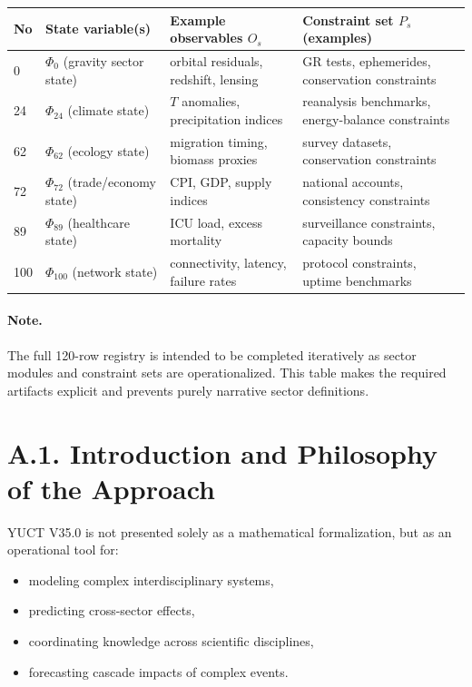 \documentclass[13pt,a4paper]{article}
\begin{document}
	\begin{longtable}{|p{0.8cm}|p{4.2cm}|p{4.5cm}|p{4.7cm}|}
		\hline
		\textbf{No} & \textbf{State variable(s)} & \textbf{Example observables $O_s$} & \textbf{Constraint set $P_s$ (examples)} \\
		\hline
		\endhead
		0 & $\Phi_0$ (gravity sector state) & orbital residuals, redshift, lensing & GR tests, ephemerides, conservation constraints \\
		\hline
		24 & $\Phi_{24}$ (climate state) & $T$ anomalies, precipitation indices & reanalysis benchmarks, energy-balance constraints \\
		\hline
		62 & $\Phi_{62}$ (ecology state) & migration timing, biomass proxies & survey datasets, conservation constraints \\
		\hline
		72 & $\Phi_{72}$ (trade/economy state) & CPI, GDP, supply indices & national accounts, consistency constraints \\
		\hline
		89 & $\Phi_{89}$ (healthcare state) & ICU load, excess mortality & surveillance constraints, capacity bounds \\
		\hline
		100 & $\Phi_{100}$ (network state) & connectivity, latency, failure rates & protocol constraints, uptime benchmarks \\
		\hline
	\end{longtable}
	
	\paragraph{Note.}
	The full 120-row registry is intended to be completed iteratively as sector modules and constraint sets are operationalized. This table makes the required artifacts explicit and prevents purely narrative sector definitions.
	
	\section*{A.1. Introduction and Philosophy of the Approach}
	
	YUCT V35.0 is not presented solely as a mathematical formalization, but as an operational tool for:
	\begin{itemize}[leftmargin=*]
		\item modeling complex interdisciplinary systems,
		\item predicting cross-sector effects,
		\item coordinating knowledge across scientific disciplines,
		\item forecasting cascade impacts of complex events.
	\end{itemize}
\end{document}

